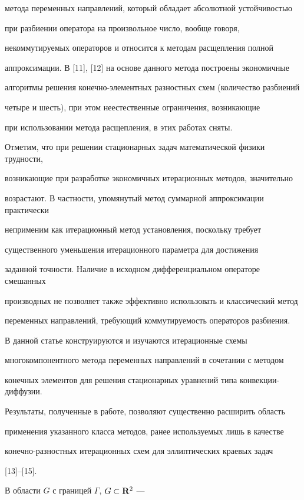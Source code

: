 метода переменных направлений, который обладает абсолютной устойчивостью


при разбиении оператора на произвольное число, вообще говоря, 


некоммутируемых операторов и относится к методам расщепления полной


аппроксимации. В [11], [12] на основе данного метода построены экономичные


алгоритмы решения конечно-элементных разностных схем (количество разбиений


четыре и шесть), при этом неестественные ограничения, возникающие


при использовании метода расщепления, в этих работах сняты. 





Отметим, что при решении стационарных задач математической физики трудности,


возникающие при разработке экономичных итерационных методов, значительно


возрастают. В частности, упомянутый метод суммарной аппроксимации практически


неприменим как итерационный метод установления, поскольку требует


существенного уменьшения итерационного параметра для достижения


заданной точности. Наличие в исходном дифференциальном операторе смешанных


производных не позволяет также эффективно использовать и классический метод


переменных направлений, требующий коммутируемость операторов разбиения.


В данной статье конструируются и изучаются итерационные схемы


многокомпонентного метода переменных направлений в сочетании с методом


конечных элементов для решения стационарных уравнений типа конвекции-диффузии.


Результаты, полученные в работе, позволяют существенно расширить область


применения указанного класса методов, ранее используемых лишь в качестве


конечно-разностных итерационных схем для эллиптических краевых задач


[13]--[15].





В области $G$ с границей $\Gamma$, $G\subset{\bold R}^2$ --- 


